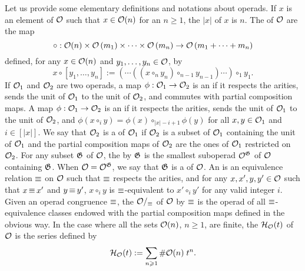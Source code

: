 Let us provide some elementary definitions and notations about operads.
If $x$ is an element of $\mathcal{O}$ such that $x \in \mathcal{O}(n)$ for an
$n \geq 1$, the  $|x|$ of $x$ is $n$. The
 of $\mathcal{O}$ are the map
\begin{equation}
    \circ : \mathcal{O}(n) \times
    \mathcal{O}\left(m_1\right) \times \dots \times \mathcal{O}\left(m_n\right)
    \to \mathcal{O}\left(m_1 + \dots + m_n\right)
\end{equation}
defined, for any $x \in \mathcal{O}(n)$ and $y_1, \dots, y_n \in \mathcal{O}$, by
\begin{equation} \label{equ:complete_composition}
    x \circ \left[y_1, \dots, y_n\right] :=
    \left(\cdots \left(\left(x \circ_n y_n\right)
    \circ_{n - 1} y_{n - 1}\right) \cdots\right) \circ_1 y_1.
\end{equation}
If $\mathcal{O}_1$ and $\mathcal{O}_2$ are two operads, a map
$\phi : \mathcal{O}_1 \to \mathcal{O}_2$ is an  if it respects
the arities, sends the unit of $\mathcal{O}_1$ to the unit of $\mathcal{O}_2$, and
commutes with partial composition maps. A map $\phi : \mathcal{O}_1 \to \mathcal{O}_2$
is an  if it respects the arities, sends the
unit of $\mathcal{O}_1$ to the unit of $\mathcal{O}_2$, and
\begin{math}
    \phi\left(x \circ_i y\right) = \phi(x) \circ_{|x|-i+1} \phi(y)
\end{math}
for all $x, y \in \mathcal{O}_1$ and $i \in [|x|]$. We say that $\mathcal{O}_2$ is a
 of $\mathcal{O}_1$ if $\mathcal{O}_2$ is a subset of $\mathcal{O}_1$
containing the unit of $\mathcal{O}_1$ and the partial composition maps of
$\mathcal{O}_2$ are the ones of $\mathcal{O}_1$ restricted on $\mathcal{O}_2$. For any subset
$\mathfrak{G}$ of $\mathcal{O}$, the  by
$\mathfrak{G}$ is the smallest suboperad $\mathcal{O}^{\mathfrak{G}}$ of
$\mathcal{O}$ containing $\mathfrak{G}$. When $\mathcal{O} = \mathcal{O}^{\mathfrak{G}}$,
we say that $\mathfrak{G}$ is a  of $\mathcal{O}$. An
 is an equivalence relation $\operatorname{\equiv}$ on $\mathcal{O}$
such that $\operatorname{\equiv}$ respects the arities, and for any
$x, x', y, y' \in \mathcal{O}$ such that $x \operatorname{\equiv} x'$ and $y \operatorname{\equiv} y'$,
$x \circ_i y$ is $\operatorname{\equiv}$-equivalent to $x' \circ_i y'$ for any valid
integer $i$. Given an operad congruence $\operatorname{\equiv}$, the
 $\mathcal{O}/_{\operatorname{\equiv}}$ of $\mathcal{O}$ by $\operatorname{\equiv}$ is the
operad of all $\operatorname{\equiv}$-equivalence classes endowed with the partial
composition maps defined in the obvious way. In the case where all the
sets $\mathcal{O}(n)$, $n \geq 1$, are finite, the 
$\mathcal{H}_{\mathcal{O}}(t)$ of $\mathcal{O}$ is the series defined by
\begin{equation} \label{equ:hilbert_series}
    \mathcal{H}_{\mathcal{O}}(t) := \sum_{n \geqslant 1} \# \mathcal{O}(n) \; t^n.
\end{equation}
\medbreak

